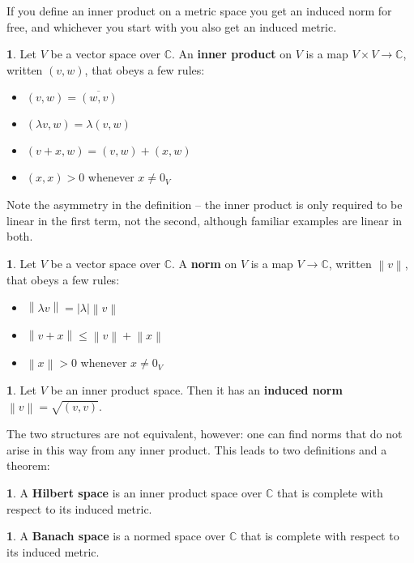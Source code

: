 \documentclass[oneside,english]{amsbook}
\numberwithin{section}{chapter}
\theoremstyle{plain}
\theoremstyle{definition}
\newtheorem{defn}[thm]{\protect\definitionname}
\newcommand{\norm}[1]{\left\lVert#1\right\rVert}
\providecommand{\definitionname}{Definition}
\begin{document}
If you define an inner product on a metric space you get an induced norm for free, and whichever you start with you also get an induced metric. 
\begin{defn}
	Let $V$ be a vector space over $\mathbb{C}$. An \textbf{inner product} on $V$ is a map $V\times V\to \mathbb{C}$, written $(v, w)$, that obeys a few rules:
	\begin{itemize}
		\item $(v, w) = \overline{(w, v)}$
		\item $(\lambda v, w) = \lambda(v, w)$
		\item $(v + x, w) = (v, w) + (x, w)$
		\item $(x, x) > 0$ whenever $x\ne 0_V$
	\end{itemize}
\end{defn}

Note the asymmetry in the definition -- the inner product is only required to be linear in the first term, not the second, although familiar examples are linear in both.

\begin{defn}
	Let $V$ be a vector space over $\mathbb{C}$. A \textbf{norm} on $V$ is a map $V\to \mathbb{C}$, written $\norm{v}$, that obeys a few rules:
	\begin{itemize}
		\item $\norm{\lambda v} = |\lambda|\norm{v}$
		\item $\norm{v + x} \le \norm{v} + \norm{x}$
		\item $\norm{x} > 0$ whenever $x\ne 0_V$
	\end{itemize}
\end{defn}

\begin{defn}Let $V$ be an inner product space. Then it has an \textbf{induced norm} $\norm{v} = \sqrt{(v, v)}$.
\end{defn}

The two structures are not equivalent, however: one can find norms that do not arise in this way from any inner product. This leads to two definitions and a theorem:

\begin{defn} A \textbf{Hilbert space} is an inner product space over $\mathbb{C}$ that is complete with respect to its induced metric.
\end{defn}

\begin{defn} A \textbf{Banach space} is a normed space over $\mathbb{C}$ that is complete with respect to its induced metric.
\end{defn}
\end{document}
